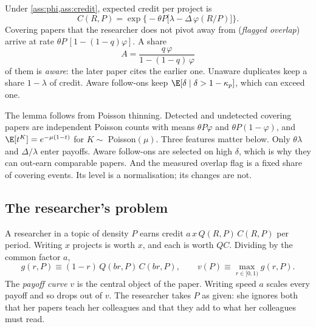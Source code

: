 \begin{lemma}\label{lem:credit}
Under \cref{ass:phi,ass:credit}, expected credit per project is
\begin{equation}\label{eq:credit}
C(R,P)=\exp\!\Big\{-\theta P\big[\lambda-\Delta\,\varphi(R/P)\big]\Big\}.
\end{equation}
Covering papers that the researcher does not pivot away from (\emph{flagged
overlap}) arrive at rate $\theta P\,[1-(1-q)\varphi]$. A share
\begin{equation}\label{eq:aware}
A=\frac{q\,\varphi}{1-(1-q)\,\varphi}
\end{equation}
of them is \emph{aware}: the later paper cites the earlier one. Unaware
duplicates keep a share $1-\lambda$ of credit. Aware follow-ons keep
$\E[\delta\mid\delta>1-\kappa_p]$, which can exceed one.
\end{lemma}

The lemma follows from Poisson thinning. Detected and undetected covering
papers are independent Poisson counts with means $\theta P\varphi$ and
$\theta P(1-\varphi)$, and $\E[t^K]=e^{-\mu(1-t)}$ for $K\sim$ Poisson$(\mu)$.
Three features matter below. Only $\theta\lambda$ and $\Delta/\lambda$ enter
payoffs. Aware follow-ons are selected on high $\delta$, which is why they can
out-earn comparable papers. And the measured overlap flag is a fixed share of
covering events. Its level is a normalisation; its changes are not.

\subsection{The researcher's problem}

A researcher in a topic of density $P$ earns credit $a\,x\,Q(R,P)\,C(R,P)$ per
period. Writing $x$ projects is worth $x$, and each is worth $QC$. Dividing
by the common factor $a$,
\begin{equation}\label{eq:g}
g(r,P)\equiv(1-r)\,Q(br,P)\,C(br,P),\qquad v(P)\equiv\max_{r\in[0,1)}g(r,P).
\end{equation}
The \emph{payoff curve} $v$ is the central object of the paper. Writing speed $a$
scales every payoff and so drops out of $v$. The researcher takes $P$ as given:
she ignores both that her papers teach her colleagues and that they add to
what her colleagues must read.

